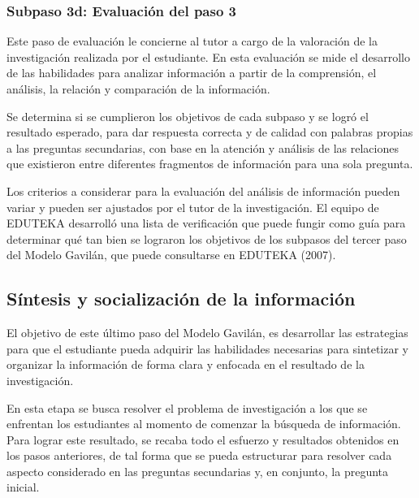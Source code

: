 
\subsubsection{Subpaso 3d: Evaluación del paso 3}
\label{secPaso3dCap2}

Este paso de evaluación le concierne al tutor a cargo de la valoración de la investigación realizada por el estudiante. En esta evaluación se mide el desarrollo de las habilidades para analizar información a partir de la comprensión, el análisis, la relación y comparación de la información.

Se determina si se cumplieron los objetivos de cada subpaso y se logró el resultado esperado, para dar respuesta correcta y de calidad con palabras propias a las preguntas secundarias, con base en la atención y análisis de las relaciones que existieron entre diferentes fragmentos de información para una sola pregunta.

Los criterios a considerar para la evaluación del análisis de información pueden variar y pueden ser ajustados por el tutor de la investigación. El equipo de EDUTEKA desarrolló una lista de verificación que puede fungir como guía para determinar qué tan bien se lograron los objetivos de los subpasos del tercer paso del Modelo Gavilán, que puede consultarse en EDUTEKA (2007).


\subsection{Síntesis y socialización de la información}
\label{secPaso4Cap2}

El objetivo de este último paso del Modelo Gavilán, es desarrollar las estrategias para que el estudiante pueda adquirir las habilidades necesarias para sintetizar y organizar la información de forma clara y enfocada en el resultado de la investigación.

En esta etapa se busca resolver el problema de investigación a los que se enfrentan los estudiantes al momento de comenzar la búsqueda de información. Para lograr este resultado, se recaba todo el esfuerzo y resultados obtenidos en los pasos anteriores, de tal forma que se pueda estructurar para resolver cada aspecto considerado en las preguntas secundarias y, en conjunto, la pregunta inicial.

